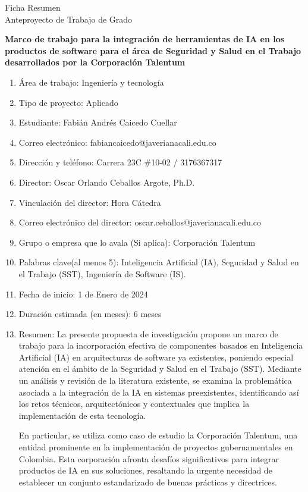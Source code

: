 \thispagestyle{empty}
\begin{center}
    \Large{Ficha Resumen \\ Anteproyecto de Trabajo de Grado}
\end{center}

\textbf{Marco de trabajo para la integración de herramientas de IA en los productos de software para el área de Seguridad y Salud en el Trabajo desarrollados por la Corporación Talentum}
\begin{enumerate}
    \item Área de trabajo: Ingeniería y tecnología
    \item Tipo de proyecto: Aplicado
    \item Estudiante: Fabián Andrés Caicedo Cuellar
    \item Correo electrónico: fabiancaicedo@javerianacali.edu.co
    \item Dirección y teléfono: Carrera 23C \#10-02 / 3176367317
    \item Director: Oscar Orlando Ceballos Argote, Ph.D.
    \item Vinculación del director: Hora C\'atedra
    \item Correo electrónico del director: oscar.ceballos@javerianacali.edu.co
    \item Grupo o empresa que lo avala (Si aplica): Corporación Talentum
    \item Palabras clave(al menos 5): Inteligencia Artificial (IA), Seguridad y Salud en el Trabajo
(SST), Ingeniería de Software (IS).
    \item Fecha de inicio: 1 de Enero de 2024
    \item Duración estimada (en meses): 6 meses
    \item Resumen:  La presente propuesta de investigación propone un marco de trabajo para la incorporación efectiva de componentes basados en Inteligencia Artificial (IA) en arquitecturas de software ya existentes, poniendo especial atención en el ámbito de la Seguridad y Salud en el Trabajo (SST). Mediante un análisis y revisión de la literatura existente, se examina la problemática asociada a la integración de la IA en sistemas preexistentes, identificando así los retos técnicos, arquitectónicos y contextuales que implica la implementación de esta tecnología.

En particular, se utiliza como caso de estudio la Corporación Talentum, una entidad prominente en la implementación de proyectos gubernamentales en Colombia. Esta corporación afronta desafíos significativos para integrar productos de IA en sus soluciones, resaltando la urgente necesidad de establecer un conjunto estandarizado de buenas prácticas y directrices.


\end{enumerate}
